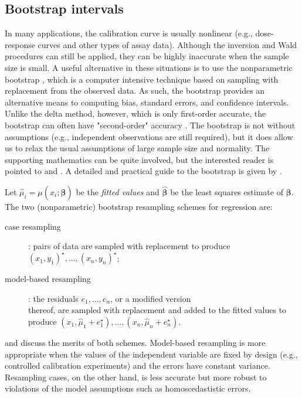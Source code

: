 \documentclass[cmfont,usenames,dvipsnames,leqno]{afit-etd}\usepackage[]{graphicx}\usepackage[]{color}
\newcommand{\boot}{\star} %
\newcommand{\wh}[1]{\ensuremath{\widehat{#1}}}
\begin{document}
\subsection{Bootstrap intervals}
\label{sec:boot_int}
In many applications, the calibration curve is usually nonlinear (e.g., dose-response curves and other types of assay data). Although the inversion and Wald procedures can still be applied, they can be highly inaccurate when the sample size is small. A useful alternative in these situations is to use the nonparametric bootstrap \citep{efron_bootstrap_1979}, which is a computer intensive technique based on sampling with replacement from the observed data. As such, the bootstrap provides an alternative means to computing bias, standard errors, and confidence intervals. Unlike the delta method, however, which is only first-order accurate, the bootstrap can often have "second-order" accuracy \citep[pg. 517]{casella_statistical_2002}. The bootstrap is not without assumptions (e.g., independent observations are still required), but it does allow us to relax the usual assumptions of large sample size and normality. The supporting mathematics can be quite involved, but the interested reader is pointed to \citet{efron_boot_1994} and \citet{hall_bootstrap_1992}. A detailed and practical guide to the bootstrap is given by \citet{davison_bootstrap_1997}. 

Let $\wh{\mu}_i = \mu\left(x_i; \wh{\bm{\beta}}\right)$ be the \textit{fitted values} and $\wh{\bm{\beta}}$ be the least squares estimate of $\bm{\beta}$. The two (nonparametric) bootstrap resampling schemes for regression are:
\begin{description}
  \item[case resampling]: pairs of data are sampled with replacement to produce \\ $(x_1, y_1)^\boot, \dotsc, (x_n, y_n)^\boot$;
  \item[model-based resampling]: the residuals $e_1, \dotsc, e_n$, or a modified version \\thereof, are sampled with replacement and added to the fitted values to produce $(x_1, \wh{\mu}_1+e_1^\boot), \dotsc, (x_n, \wh{\mu}_n+e_n^\boot)$.
\end{description}
\citet{efron_boot_1994} and \citet{davison_bootstrap_1997} discuss the merits of both schemes. Model-based resampling is more appropriate when the values of the independent variable are fixed by design (e.g., controlled calibration experiments) and the errors have constant variance. Resampling cases, on the other hand, is less accurate but more robust to violations of the model assumptions such as homoscedastistic errors. 
\end{document}
